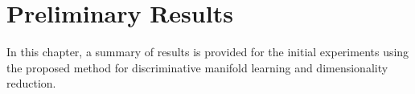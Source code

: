 \chapter{Preliminary Results}
In this chapter, a summary of results is provided for the initial experiments using the proposed method for discriminative manifold learning and dimensionality reduction. 
